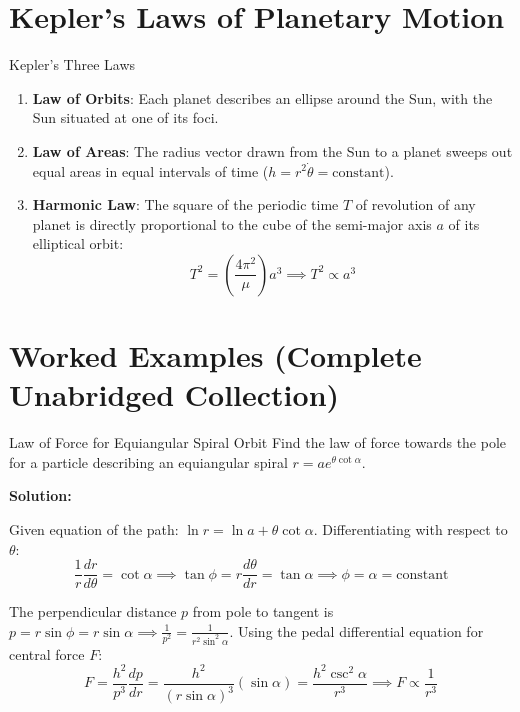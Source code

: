 \section{Kepler's Laws of Planetary Motion}

\begin{theorembox}{Kepler's Three Laws}
\begin{enumerate}[label=\textbf{Law \Roman*:}, leftmargin=4.5em]
    \item \textbf{Law of Orbits}: Each planet describes an ellipse around the Sun, with the Sun situated at one of its foci.
    \item \textbf{Law of Areas}: The radius vector drawn from the Sun to a planet sweeps out equal areas in equal intervals of time ($h = r^2 \dot{\theta} = \text{constant}$).
    \item \textbf{Harmonic Law}: The square of the periodic time $T$ of revolution of any planet is directly proportional to the cube of the semi-major axis $a$ of its elliptical orbit:
    \begin{equation}
        T^2 = \left( \frac{4\pi^2}{\mu} \right) a^3 \implies T^2 \propto a^3
    \end{equation}
\end{enumerate}
\end{theorembox}

\section{Worked Examples (Complete Unabridged Collection)}

\begin{examplebox}{Law of Force for Equiangular Spiral Orbit}
Find the law of force towards the pole for a particle describing an equiangular spiral $r = a e^{\theta \cot\alpha}$.

\tcblower
\textbf{Solution:}

Given equation of the path: $\ln r = \ln a + \theta \cot\alpha$.
Differentiating with respect to $\theta$:
\begin{equation*}
    \frac{1}{r} \frac{dr}{d\theta} = \cot\alpha \implies \tan\phi = r \frac{d\theta}{dr} = \tan\alpha \implies \phi = \alpha = \text{constant}
\end{equation*}

The perpendicular distance $p$ from pole to tangent is $p = r \sin\phi = r \sin\alpha \implies \frac{1}{p^2} = \frac{1}{r^2 \sin^2\alpha}$.
Using the pedal differential equation for central force $F$:
\begin{equation*}
    F = \frac{h^2}{p^3} \frac{dp}{dr} = \frac{h^2}{(r \sin\alpha)^3} (\sin\alpha) = \frac{h^2 \csc^2\alpha}{r^3} \implies F \propto \frac{1}{r^3}
\end{equation*}
\end{examplebox}

